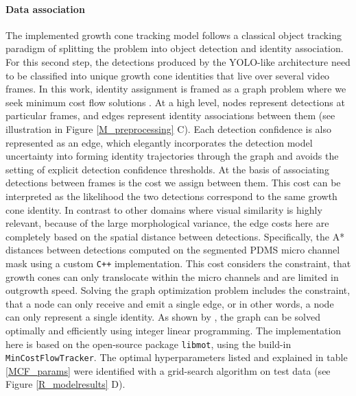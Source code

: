 \paragraph{Data association}
\label{data_association}
The implemented growth cone tracking model follows a classical object tracking
paradigm of splitting the problem into object detection and identity
association. For this second step, the detections produced by the YOLO-like
architecture need to be classified into unique growth cone identities that live
over several video frames. In this work, identity assignment is framed as a
graph problem where we seek minimum cost flow solutions \parencite{MCF}. At a
high level, nodes represent detections at particular frames, and edges represent
identity associations between them (see illustration in Figure
\ref{M_preprocessing} C). Each detection confidence is also represented as an
edge, which elegantly incorporates the detection model uncertainty into forming
identity trajectories through the graph and avoids the setting of explicit
detection confidence thresholds. At the basis of associating detections between
frames is the cost we assign between them. This cost can be interpreted as the
likelihood the two detections correspond to the same growth cone identity. In
contrast to other domains where visual similarity is highly relevant, because of
the large morphological variance, the edge costs here are completely based on
the spatial distance between detections. Specifically, the A* distances
\parencite{astar} between detections computed on the segmented PDMS micro
channel mask using a custom \verb|C++| implementation. This cost considers the
constraint, that growth cones can only translocate within the micro channels and
are limited in outgrowth speed. Solving the graph optimization problem includes
the constraint, that a node can only receive and emit a single edge, or in other
words, a node can only represent a single identity. As shown by \cite{MCF}, the
graph can be solved optimally and efficiently using integer linear programming.
The implementation here is based on the open-source package \verb|libmot|, using
the build-in \verb|MinCostFlowTracker|. The optimal hyperparameters listed and
explained in table \ref{MCF_params} were identified with a grid-search algorithm
on test data (see Figure \ref{R_modelresults} D). 


